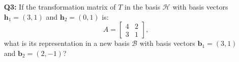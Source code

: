 \documentclass[a4paper,11pt,reqno]{amsart}
\numberwithin{equation}{section}
\begin{document}
\begin{enumerate}
    \item[\textbf{Q3:}]
    If the transformation matrix of \( T \) in the basis \( {\mathcal{H}} \) with basis vectors \( \mathbf{h}_1 = (3,1) \) and \( \mathbf{h}_2 = (0,1) \) is:
    \[
    A = \begin{bmatrix} 4 & 2 \\ 3 & 1 \end{bmatrix},
    \]
    what is its representation in a new basis \( {\mathcal{B}} \) with basis vectors \( \mathbf{b}_1 = (3,1) \) and \( \mathbf{b}_2 = (2,-1) \)?
\end{enumerate}





\end{document}
